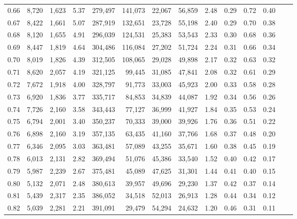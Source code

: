 \begin{tabular}{rrrrrrrrrrrrrr}
0.66 &  8,720 &  1,623 &     5.37 &  279,497 &  141,073 &  22,067 &  56,859 &  2.48 &  0.29 &  0.72 &      0.40 \\
0.67 &  8,422 &  1,661 &     5.07 &  287,919 &  132,651 &  23,728 &  55,198 &  2.40 &  0.29 &  0.70 &      0.38 \\
0.68 &  8,120 &  1,655 &     4.91 &  296,039 &  124,531 &  25,383 &  53,543 &  2.33 &  0.30 &  0.68 &      0.36 \\
0.69 &  8,447 &  1,819 &     4.64 &  304,486 &  116,084 &  27,202 &  51,724 &  2.24 &  0.31 &  0.66 &      0.34 \\
0.70 &  8,019 &  1,826 &     4.39 &  312,505 &  108,065 &  29,028 &  49,898 &  2.17 &  0.32 &  0.63 &      0.32 \\
0.71 &  8,620 &  2,057 &     4.19 &  321,125 &   99,445 &  31,085 &  47,841 &  2.08 &  0.32 &  0.61 &      0.29 \\
0.72 &  7,672 &  1,918 &     4.00 &  328,797 &   91,773 &  33,003 &  45,923 &  2.00 &  0.33 &  0.58 &      0.28 \\
0.73 &  6,920 &  1,836 &     3.77 &  335,717 &   84,853 &  34,839 &  44,087 &  1.92 &  0.34 &  0.56 &      0.26 \\
0.74 &  7,726 &  2,160 &     3.58 &  343,443 &   77,127 &  36,999 &  41,927 &  1.84 &  0.35 &  0.53 &      0.24 \\
0.75 &  6,794 &  2,001 &     3.40 &  350,237 &   70,333 &  39,000 &  39,926 &  1.76 &  0.36 &  0.51 &      0.22 \\
0.76 &  6,898 &  2,160 &     3.19 &  357,135 &   63,435 &  41,160 &  37,766 &  1.68 &  0.37 &  0.48 &      0.20 \\
0.77 &  6,346 &  2,095 &     3.03 &  363,481 &   57,089 &  43,255 &  35,671 &  1.60 &  0.38 &  0.45 &      0.19 \\
0.78 &  6,013 &  2,131 &     2.82 &  369,494 &   51,076 &  45,386 &  33,540 &  1.52 &  0.40 &  0.42 &      0.17 \\
0.79 &  5,987 &  2,239 &     2.67 &  375,481 &   45,089 &  47,625 &  31,301 &  1.44 &  0.41 &  0.40 &      0.15 \\
0.80 &  5,132 &  2,071 &     2.48 &  380,613 &   39,957 &  49,696 &  29,230 &  1.37 &  0.42 &  0.37 &      0.14 \\
0.81 &  5,439 &  2,317 &     2.35 &  386,052 &   34,518 &  52,013 &  26,913 &  1.28 &  0.44 &  0.34 &      0.12 \\
0.82 &  5,039 &  2,281 &     2.21 &  391,091 &   29,479 &  54,294 &  24,632 &  1.20 &  0.46 &  0.31 &      0.11 \\

\end{tabular}

